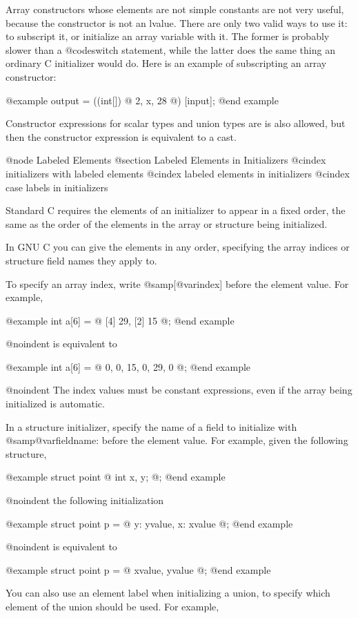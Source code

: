 {Array constructors whose elements are not simple constants are
not very useful, because the constructor is not an lvalue.  There
are only two valid ways to use it: to subscript it, or initialize
an array variable with it.  The former is probably slower than a
@code{switch} statement, while the latter does the same thing an
ordinary C initializer would do.  Here is an example of
subscripting an array constructor:

@example
output = ((int[]) @{ 2, x, 28 @}) [input];
@end example

Constructor expressions for scalar types and union types are is
also allowed, but then the constructor expression is equivalent
to a cast.

@node Labeled Elements
@section Labeled Elements in Initializers
@cindex initializers with labeled elements
@cindex labeled elements in initializers
@cindex case labels in initializers

Standard C requires the elements of an initializer to appear in a fixed
order, the same as the order of the elements in the array or structure
being initialized.

In GNU C you can give the elements in any order, specifying the array
indices or structure field names they apply to.

To specify an array index, write @samp{[@var{index}]} before the
element value.  For example,

@example
int a[6] = @{ [4] 29, [2] 15 @};
@end example

@noindent
is equivalent to

@example
int a[6] = @{ 0, 0, 15, 0, 29, 0 @};
@end example

@noindent
The index values must be constant expressions, even if the array being
initialized is automatic.

In a structure initializer, specify the name of a field to initialize
with @samp{@var{fieldname}:} before the element value.  For example,
given the following structure, 

@example
struct point @{ int x, y; @};
@end example

@noindent
the following initialization

@example
struct point p = @{ y: yvalue, x: xvalue @};
@end example

@noindent
is equivalent to

@example
struct point p = @{ xvalue, yvalue @};
@end example

You can also use an element label when initializing a union, to
specify which element of the union should be used.  For example,

}
